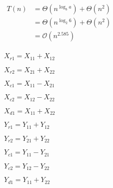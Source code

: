 \documentclass[10pt]{book}
\begin{document}
\begin{mdSnippets}
\begin{mdInlineSnippet}
$\begin{aligned}T(n) &= \Theta(n^ {\log_b a }) + \Theta(n^2)\\   &= \Theta(n^{\log_2 6}) + \Theta(n^2)\\&= \mathcal{O}(n^{2.585})\\\end{aligned} $\end{mdInlineSnippet}%
\begin{mdInlineSnippet}%
$X_{r1}=X_{11}+X_{12}$\end{mdInlineSnippet}%
\begin{mdInlineSnippet}[d119056ad5637d97c5e49e2f81b0486a]%
$X_{r2}=X_{21}+X_{22}$\end{mdInlineSnippet}%
\begin{mdInlineSnippet}[fd65b82d752a01af24d1567f33542e59]%
$X_{c1}=X_{11}-X_{21}$\end{mdInlineSnippet}%
\begin{mdInlineSnippet}%
$X_{c2}=X_{12}-X_{22}$\end{mdInlineSnippet}%
\begin{mdInlineSnippet}%
$X_{d1}=X_{11}+X_{22}$\end{mdInlineSnippet}%
\begin{mdInlineSnippet}[4f032859d4203874c759cbb3563b9164]%
$Y_{r1}=Y_{11}+Y_{12}$\end{mdInlineSnippet}%
\begin{mdInlineSnippet}[3ac4b5d83f215e74217c6a0929f7d351]%
$Y_{r2}=Y_{21}+Y_{22}$\end{mdInlineSnippet}%
\begin{mdInlineSnippet}[9249c4c3e743cf43dc4fbadc6120a071]%
$Y_{c1}=Y_{11}-Y_{21}$\end{mdInlineSnippet}%
\begin{mdInlineSnippet}[bd096bb7c810371f6947bb97e2dbc314]%
$Y_{c2}=Y_{12}-Y_{22}$\end{mdInlineSnippet}%
\begin{mdInlineSnippet}[c6f4e872076d509138b66deecd6e224e]%
$Y_{d1}=Y_{11}+Y_{22}$\end{mdInlineSnippet}%
\begin{mdInlineSnippet}[c3c401384a6b2db6669c0ee4425fe863]%

\end{mdInlineSnippet}
\end{mdSnippets}
\end{document}
